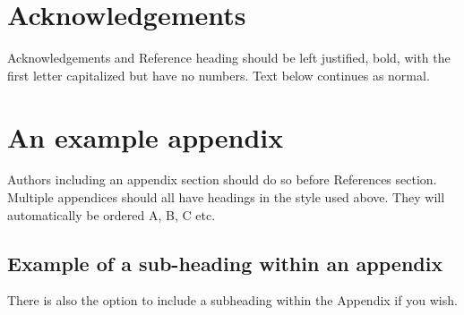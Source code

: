 \documentclass[3p,times,procedia]{elsarticle}
\begin{document}
\section*{Acknowledgements}

Acknowledgements and Reference heading should be left justified, bold, with the first letter capitalized but have no numbers. Text below continues as normal.



\appendix
\section{An example appendix}
Authors including an appendix section should do so before References section. Multiple appendices should all have headings in the style used above. They will automatically be ordered A, B, C etc.

\subsection{Example of a sub-heading within an appendix}
There is also the option to include a subheading within the Appendix if you wish.


%
%



\end{document}
